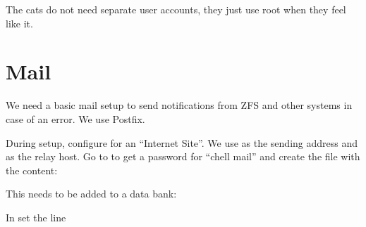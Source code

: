 \documentclass[a4paper,10pt,english]{sphinxmanual}
\begin{document}
The cats do not need separate user accounts, they just use root when they feel
like it.


\chapter{Mail}
\label{\detokenize{mail:mail}}\label{\detokenize{mail::doc}}
We need a basic mail setup to send notifications from ZFS and other systems in
case of an error. We use Postfix.

\begin{sphinxVerbatim}[commandchars=\\\{\}]
   
\end{sphinxVerbatim}

During setup, configure for an “Internet Site”. We use  as the
sending address and  as the relay host. Go to
 to get a password for “chell mail” and
create the file  with the content:

\begin{sphinxVerbatim}[commandchars=\\\{\}]
\PYG{p}{[}\PYG{p}{]} 
\end{sphinxVerbatim}

This needs to be added to a data bank:

\begin{sphinxVerbatim}[commandchars=\\\{\}]
  
\end{sphinxVerbatim}

In   set the line

\begin{sphinxVerbatim}[commandchars=\\\{\}]
  \PYG{p}{[}\PYG{p}{]}
\end{sphinxVerbatim}
\end{document}
